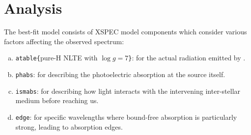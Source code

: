 \section{Analysis} \label{sec:analysis}
	The best-fit model consists of XSPEC model components which consider various factors affecting the observed spectrum:
    \begin{enumerate}[a)]
   		\item \texttt{atable\{}pure-H NLTE with $\log{g}=7$\texttt{\}}: for the actual radiation emitted by \source.
   		\item \texttt{phabs}: for describing the photoelectric absorption at the source itself.
   		\item \texttt{ismabs}: for describing how light interacts with the intervening inter-stellar medium before reaching us.
   		\item \texttt{edge}: for specific wavelengths where bound-free absorption is particularly strong, leading to absorption edges.
   	\end{enumerate}
   	
